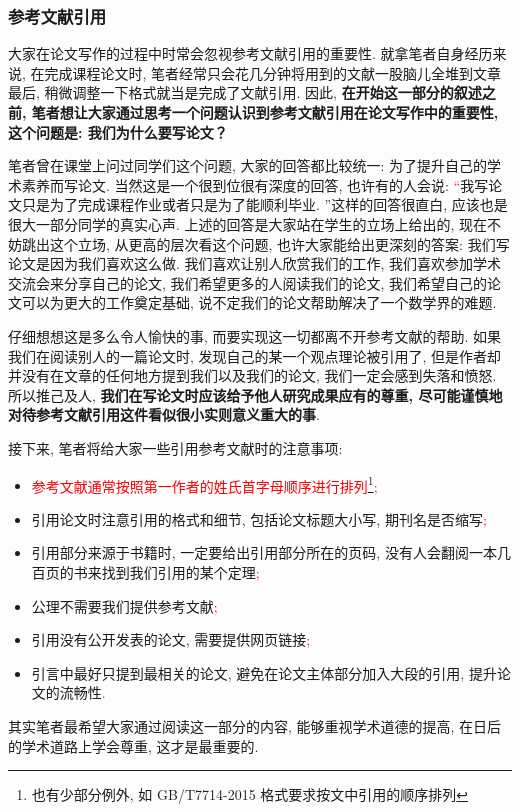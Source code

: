 \documentclass{formatBook}
\newcommand{\XG}[1]{\textcolor{red}{#1}}
\begin{document}
\subsubsection{参考文献引用}
大家在论文写作的过程中时常会忽视参考文献引用的重要性. 就拿笔者自身经历来说, 在完成课程论文时, 笔者经常只会花几分钟将用到的文献一股脑儿全堆到文章最后, 稍微调整一下格式就当是完成了文献引用. 因此, \textbf{在开始这一部分的叙述之前, 笔者想让大家通过思考一个问题认识到参考文献引用在论文写作中的重要性, 这个问题是: 我们为什么要写论文？}\par
笔者曾在课堂上问过同学们这个问题, 大家的回答都比较统一: 为了提升自己的学术素养而写论文. 当然这是一个很到位很有深度的回答, 也许有的人会说: \XG{``}我写论文只是为了完成课程作业或者只是为了能顺利毕业. ''这样的回答很直白, 应该也是很大一部分同学的真实心声. 上述的回答是大家站在学生的立场上给出的, 现在不妨跳出这个立场, 从更高的层次看这个问题, 也许大家能给出更深刻的答案: 我们写论文是因为我们喜欢这么做. 我们喜欢让别人欣赏我们的工作, 我们喜欢参加学术交流会来分享自己的论文, 我们希望更多的人阅读我们的论文, 我们希望自己的论文可以为更大的工作奠定基础, 说不定我们的论文帮助解决了一个数学界的难题. \par
仔细想想这是多么令人愉快的事, 而要实现这一切都离不开参考文献的帮助. 如果我们在阅读别人的一篇论文时, 发现自己的某一个观点理论被引用了, 但是作者却并没有在文章的任何地方提到我们以及我们的论文, 我们一定会感到失落和愤怒. 所以推己及人, \textbf{我们在写论文时应该给予他人研究成果应有的尊重, 尽可能谨慎地对待参考文献引用这件看似很小实则意义重大的事}. \par
接下来, 笔者将给大家一些引用参考文献时的注意事项:
\begin{itemize}
    \item \XG{参考文献通常按照第一作者的姓氏首字母顺序进行排列\footnote{也有少部分例外, 如 GB/T7714-2015 格式要求按文中引用的顺序排列}}\XG{;}
    \item 引用论文时注意引用的格式和细节, 包括论文标题大小写, 期刊名是否缩写\XG{;}
    \item 引用部分来源于书籍时, 一定要给出引用部分所在的页码, 没有人会翻阅一本几百页的书来找到我们引用的某个定理\XG{;}
    \item 公理不需要我们提供参考文献\XG{;}
    \item 引用没有公开发表的论文, 需要提供网页链接\XG{;}
    \item 引言中最好只提到最相关的论文, 避免在论文主体部分加入大段的引用, 提升论文的流畅性\XG{.}
\end{itemize}
\par
其实笔者最希望大家通过阅读这一部分的内容, 能够重视学术道德的提高, 在日后的学术道路上学会尊重, 这才是最重要的.
\end{document}
